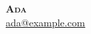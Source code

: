 \documentclass[letterpaper,11pt]{article}
\renewcommand{\small}{\fontsize{9.1}{10.9}\selectfont}
\renewcommand{\Huge}{\fontsize{22.6}{27.0}\selectfont}
\begin{document}
\begin{center}
    \textbf{\Huge \scshape Ada} \\ \vspace{1pt}
    \small
    \href{mailto:ada@example.com}{\underline{ada@example.com}}%
\end{center}

\end{document}
